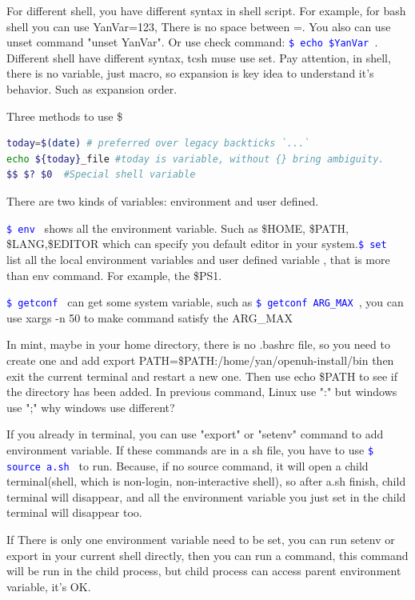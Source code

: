 \documentclass[paper=8.5in:11in, twoside, 12pt, pagesize=pdftex]{book}
\newcommand{\linuxcommand}[1]{\texttt{\textcolor{blue}{\$ #1 \Pisymbol{psy}{191}}}}
\begin{document}
	\par For different shell, you have different syntax in shell script. For example, for bash shell you can use YanVar=123, There is no space between =. You also can use unset command "unset YanVar". Or use check command: \linuxcommand{echo \$YanVar}. Different shell have different syntax, tcsh muse use set. Pay attention, in shell, there is no variable, just macro, so expansion is key idea to understand it's behavior. Such as expansion order.
	
	Three methods to use \$
\begin{lstlisting}[language=bash]
today=$(date) # preferred over legacy backticks `...`
echo ${today}_file #today is variable, without {} bring ambiguity.
$$ $? $0  #Special shell variable
\end{lstlisting}

	There are two kinds of variables: environment and user defined.

	\linuxcommand{env} shows all the environment variable. Such as \$HOME,  \$PATH, \$LANG,\$EDITOR which can specify you default editor in your system.\linuxcommand{set} list all the local environment variables and user defined variable , that is more than env command. For example, the \$PS1.  

	\linuxcommand{getconf} can get some system variable, such as \linuxcommand{getconf ARG\_MAX}, you can use xargs -n 50 to make command satisfy the ARG\_MAX
	
	In mint, maybe in your home directory, there is no .bashrc file, so you need to create one and add export PATH=\$PATH:/home/yan/openuh-install/bin  then exit the current terminal and restart a new one. Then use echo \$PATH to see if the directory has been added. In previous command, Linux use ":" but windows use ";" why windows use different?  
			
	If you already in terminal, you can use "export" or "setenv" command to add environment variable. If these commands are in a sh file, you have to use \linuxcommand{source a.sh} to run. Because, if no source command, it will open a child terminal(shell, which is non-login, non-interactive shell), so after a.sh finish, child terminal will disappear, and all the environment variable you just set in the child terminal will disappear too. 

	If There is only one environment variable need to be set, you can run setenv or export in your current shell directly, then you can run a command, this command will be run in the child process, but child process can access parent environment variable, it's OK.
				
\end{document}
